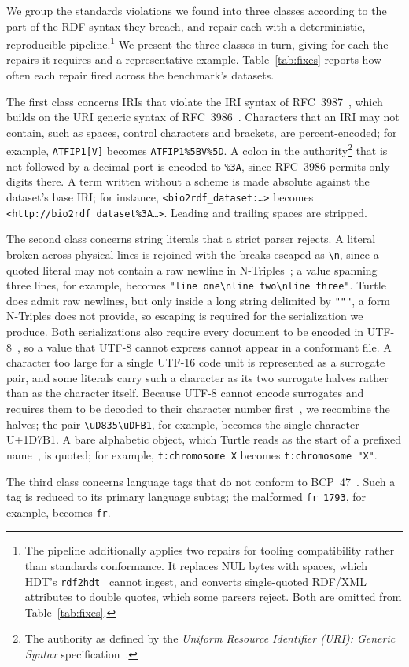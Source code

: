 We group the standards violations we found into three classes according to the part of the \ac{RDF} syntax they breach, and repair each with a deterministic, reproducible pipeline.\footnote{%
The pipeline additionally applies two repairs for tooling compatibility rather than standards conformance.
It replaces NUL bytes with spaces, which HDT's \texttt{rdf2hdt}~\cite{hdtcpp} cannot ingest, and converts single-quoted RDF/XML attributes to double quotes, which some parsers reject.
Both are omitted from Table~\ref{tab:fixes}.}
We present the three classes in turn, giving for each the repairs it requires and a representative example.
Table~\ref{tab:fixes} reports how often each repair fired across the benchmark's datasets.



The first class concerns \acp{IRI} that violate the \ac{IRI} syntax of RFC~3987~\cite{ietf3987IRI}, which builds on the URI generic syntax of RFC~3986~\cite{ietf3986URI}.
Characters that an \ac{IRI} may not contain, such as spaces, control characters and brackets, are percent-encoded; for example, \texttt{ATFIP1[V]} becomes \texttt{ATFIP1\%5BV\%5D}.
A colon in the authority\footnote{The authority as defined by the \emph{Uniform Resource Identifier (URI): Generic Syntax} specification~\cite{ietf3986URI}.} that is not followed by a decimal port is encoded to \texttt{\%3A}, since RFC~3986 permits only digits there.
A term written without a scheme is made absolute against the dataset's base \ac{IRI}; for instance, \texttt{<bio2rdf\_dataset:\ldots>} becomes \texttt{<http://bio2rdf\_dataset\%3A\ldots>}.
Leading and trailing spaces are stripped.

The second class concerns string literals that a strict parser rejects.
A literal broken across physical lines is rejoined with the breaks escaped as \texttt{\textbackslash n}, since a quoted literal may not contain a raw newline in N-Triples~\cite{w3NTriples}; a value spanning three lines, for example, becomes \texttt{"line one\textbackslash nline two\textbackslash nline three"}.
Turtle~\cite{w3Turtle} does admit raw newlines, but only inside a long string delimited by \texttt{"""}, a form N-Triples does not provide, so escaping is required for the serialization we produce.
Both serializations also require every document to be encoded in UTF-8~\cite{w3NTriples,w3Turtle}, so a value that UTF-8 cannot express cannot appear in a conformant file.
A character too large for a single UTF-16 code unit is represented as a surrogate pair, and some literals carry such a character as its two surrogate halves rather than as the character itself.
Because UTF-8 cannot encode surrogates and requires them to be decoded to their character number first~\cite{ietf3629UTF8}, we recombine the halves; the pair \texttt{\textbackslash uD835\textbackslash uDFB1}, for example, becomes the single character U+1D7B1.
A bare alphabetic object, which Turtle reads as the start of a prefixed name~\cite{w3Turtle}, is quoted; for example, \texttt{t:chromosome X} becomes \texttt{t:chromosome "X"}.

The third class concerns language tags that do not conform to BCP~47~\cite{ietf5646BCP47}.
Such a tag is reduced to its primary language subtag; the malformed \texttt{fr\_1793}, for example, becomes \texttt{fr}.
